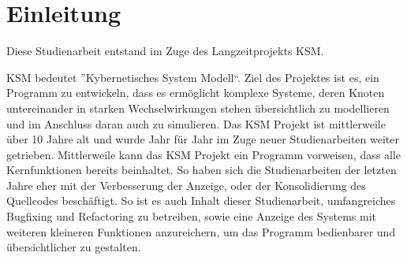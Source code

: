 \section{Einleitung}

Diese Studienarbeit entstand im Zuge des Langzeitprojekts KSM. 

KSM bedeutet ''Kybernetisches System Modell``. Ziel des Projektes ist es, ein Programm zu entwickeln, dass es ermöglicht komplexe Systeme, deren Knoten untereinander in starken Wechselwirkungen stehen übersichtlich zu modellieren und im Anschluss daran auch zu simulieren. Das KSM Projekt ist mittlerweile über 10 Jahre alt und wurde Jahr für Jahr im Zuge neuer Studienarbeiten weiter getrieben. Mittlerweile kann das KSM Projekt ein Programm vorweisen, dass alle Kernfunktionen bereits beinhaltet. So haben sich die Studienarbeiten der letzten Jahre eher mit der Verbesserung der Anzeige, oder der Konsolidierung des Quellcodes beschäftigt. So ist es auch Inhalt dieser Studienarbeit, umfangreiches Bugfixing und Refactoring zu betreiben, sowie eine Anzeige des Systems mit weiteren kleineren Funktionen anzureichern, um das Programm bedienbarer und übersichtlicher zu gestalten.
